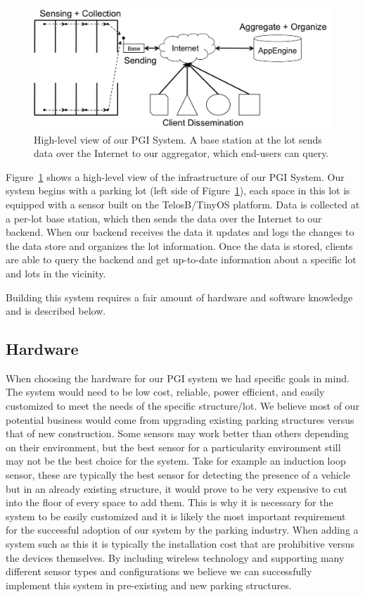 \documentclass{acm_proc}
\begin{document}
\begin{figure}
    \begin{center}
		\includegraphics[width=\columnwidth]{figures/high-level}
	\end{center}
	\caption{High-level view of our PGI System. A base station at the lot
	sends data over the Internet to our aggregator, which end-users can
	query.}
	\label{fig:high-level}
\end{figure}

Figure~\ref{fig:high-level} shows a high-level view of the infrastructure
of our PGI System.
Our system begins with a parking lot (left side of
Figure~\ref{fig:high-level}), each space in this lot is equipped with a
sensor built on the TelosB/TinyOS platform.
Data is collected at a per-lot base station, which then sends the data over
the Internet to our backend.
When our backend receives the data it updates and logs the changes to the
data store and organizes the lot information.
Once the data is stored, clients are able to query the backend and get
up-to-date information about a specific lot and lots in the vicinity.

Building this system requires a fair amount of hardware and software
knowledge and is described below.

\subsection{Hardware}
When choosing the hardware for our PGI system we had specific goals in mind.  The system would need to be low cost, reliable, power efficient, and easily customized to meet the needs of the specific structure/lot.  We believe most of our potential business would come from upgrading existing parking structures versus that of new construction.  Some sensors may work better than others depending on their environment, but the best sensor for a particularity environment still may not be the best choice for the system.  Take for example an induction loop sensor, these are typically the best sensor for detecting the presence of a vehicle but in an already existing structure, it would prove to be very expensive to cut into the floor of every space to add them.  This is why it is necessary for the system to be easily customized and it is likely the most important requirement for the successful adoption of our system by the parking industry.  When adding a system such as this it is typically the installation cost that are prohibitive versus the devices themselves.  By including wireless technology and supporting many different sensor types and configurations we believe we can successfully implement this system in pre-existing and new parking structures.
\end{document}
